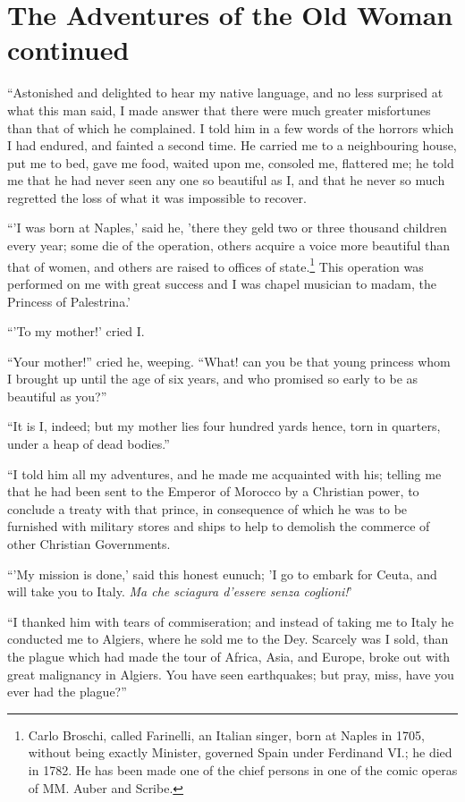 \chapter{The Adventures of the Old Woman continued}
``Astonished and delighted to hear my native language, and no less surprised at what this man said, I made answer that there were much greater misfortunes than that of which he complained. I told him in a few words of the horrors which I had endured, and fainted a second time. He carried me to a neighbouring house, put me to bed, gave me food, waited upon me, consoled me, flattered me; he told me that he had never seen any one so beautiful as I, and that he never so much regretted the loss of what it was impossible to recover.

``'I was born at Naples,' said he, 'there they geld two or three thousand children every year; some die of the operation, others acquire a voice more beautiful than that of women, and others are raised to offices of state.\footnote{Carlo Broschi, called Farinelli, an Italian singer, born at Naples in 1705, without being exactly Minister, governed Spain under Ferdinand VI.; he died in 1782. He has been made one of the chief persons in one of the comic operas of MM. Auber and Scribe.} This operation was performed on me with great success and I was chapel musician to madam, the Princess of Palestrina.'

``'To my mother!' cried I.

``Your mother!'' cried he, weeping. ``What! can you be that young princess whom I brought up until the age of six years, and who promised so early to be as beautiful as you?''

``It is I, indeed; but my mother lies four hundred yards hence, torn in quarters, under a heap of dead bodies.''

``I told him all my adventures, and he made me acquainted with his; telling me that he had been sent to the Emperor of Morocco by a Christian power, to conclude a treaty with that prince, in consequence of which he was to be furnished with military stores and ships to help to demolish the commerce of other Christian Governments.

``'My mission is done,' said this honest eunuch; 'I go to embark for Ceuta, and will take you to Italy. \textit{Ma che sciagura d'essere senza coglioni!}'

``I thanked him with tears of commiseration; and instead of taking me to Italy he conducted me to Algiers, where he sold me to the Dey. Scarcely was I sold, than the plague which had made the tour of Africa, Asia, and Europe, broke out with great malignancy in Algiers. You have seen earthquakes; but pray, miss, have you ever had the plague?''

